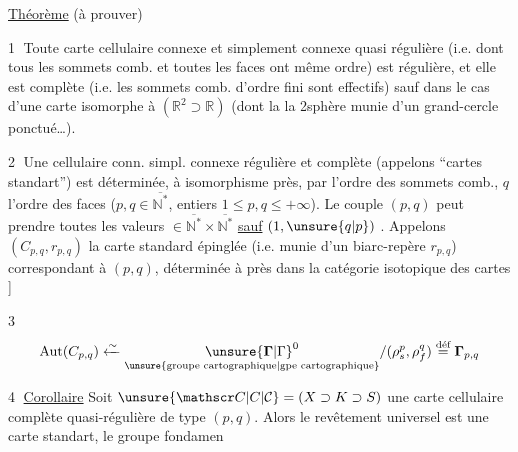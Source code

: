 \uline{Théorème} (à prouver)

\textcircled{1} Toute carte cellulaire \inserted{$\ne\varnothing$} connexe et simplement connexe quasi régulière (i.e. dont tous les sommets comb. et toutes les faces ont même ordre) est régulière, et elle est complète (i.e. les sommets comb. d'ordre fini sont effectifs) sauf dans le cas d'une carte isomorphe à $(\mathbb R^2\supset\mathbb R)$ (dont la  la 2sphère munie d'un grand-cercle ponctué\ldots).

\textcircled{2} Une  cellulaire \inserted{$\ne\varnothing$} conn. simpl. connexe régulière et complète (appelons   \textquotedblleft cartes standart\textquotedblright) est déterminée, à isomorphisme près, par   l'ordre des sommets comb., $q$ l'ordre des faces ($p,q\in\overline{\mathbb N^*}$, entiers $1\leq p,q\leq+\infty$). Le couple $(p,q)$ peut prendre toutes les valeurs  $\in\overline{\mathbb N^*}\times\overline{\mathbb N^*}$ \uline{sauf} $(1,\unsure{q|p})$ . Appelons $(C_{p,q},r_{p,q})$ la carte standard épinglée (i.e. munie d'un biarc-repère $r_{p,q}$) correspondant à $(p,q)$, déterminée à   près dans la catégorie isotopique des cartes ]

\textcircled{3}
\[
\operatorname{Aut}(C_{p,q})\xleftarrow{\sim}
\underset{\text{\unsure{groupe cartographique|gpe cartographique}}}{{\unsure{\boldsymbol{\Gamma}|\Gamma}}^{0}}/
(\rho_s^p,\rho_f^q)\overset{\text{déf}}{=}\boldsymbol{\Gamma}_{p,q}
\]

\textcircled{4} \uline{Corollaire} Soit $\unsure{\mathscr C|C|\mathcal C}=(X\supset K\supset S)$ une carte cellulaire complète  quasi-régulière de type $(p,q)$. Alors le revêtement universel  est  une carte standart, le groupe fondamen%
